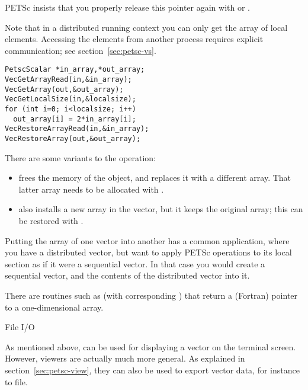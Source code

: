 PETSc insists that you properly release this pointer again with
 or
.

Note that in a distributed running context you can only get the array
of local elements. Accessing the elements from another process
requires explicit communication; see section~\ref{sec:petsc-vs}.

\begin{lstlisting}
PetscScalar *in_array,*out_array;
VecGetArrayRead(in,&in_array);
VecGetArray(out,&out_array);
VecGetLocalSize(in,&localsize);
for (int i=0; i<localsize; i++)
  out_array[i] = 2*in_array[i];
VecRestoreArrayRead(in,&in_array);
VecRestoreArray(out,&out_array);
\end{lstlisting}

There are some variants to the  operation:
\begin{itemize}
\item {} frees the memory of the
   object, and replaces it with a different array. That
  latter array needs to be allocated with
  .
\item {} also installs a new array in the
  vector, but it keeps the original array; this can be restored with
  .
\end{itemize}

Putting the array of one vector into another has a common application,
where you have a distributed vector, but want to apply PETSc operations
to its local section as if it were a sequential vector. In that case
you would create a sequential vector, and
 the contents of the distributed vector
into it.

\begin{fortrannote}
  There are routines such as 
  (with corresponding )
  that
  return a (Fortran) pointer to a one-dimensional array.
\end{fortrannote}

 {File I/O}
\label{sec:vecviewload}

As mentioned above,  can be used for
displaying a vector on the terminal screen.
However, viewers are actually much more general.
As explained in section~\ref{sec:petsc-view},
they can also be used to export vector data, for instance to file.


